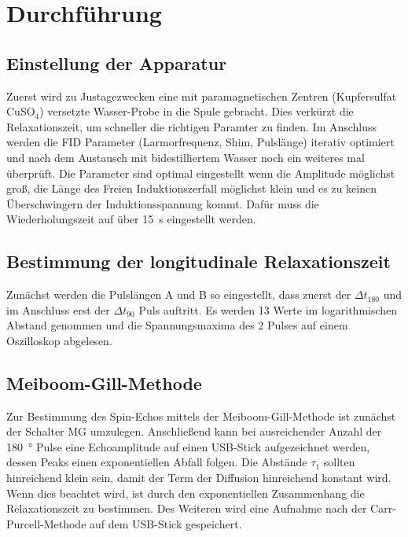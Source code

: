 \section{Durchführung}%
\label{sec:durchfuehrung}

\subsection{Einstellung der Apparatur}%
\label{sub:einstellung_der_apparatur}

Zuerst wird zu Justagezwecken eine mit paramagnetischen Zentren (Kupfersulfat
CuSO$_4$) versetzte Wasser-Probe in die Spule gebracht.
Dies verkürzt die Relaxationszeit, um schneller die richtigen Paramter zu finden.
Im Anschluss werden die FID Parameter (Larmorfrequenz, Shim, Pulslänge) iterativ optimiert und nach dem Austausch
mit bidestilliertem Wasser noch ein weiteres mal überprüft.
Die Parameter sind optimal eingestellt wenn die Amplitude möglichst groß, die
Länge des Freien Induktionszerfall möglichst klein und es zu keinen
Überschwingern der Induktionsspannung kommt.
Dafür muss die Wiederholungszeit auf über \SI{15}{\second} eingestellt werden.

\subsection{Bestimmung der longitudinale Relaxationszeit}%
\label{sub:bestimmung_der_longitudinale_relaxationszeit}
Zunächst werden die Pulslängen A und B so eingestellt, dass zuerst der
$\Delta t_{180}$ und im Anschluss erst der $\Delta t_{90}$ Puls auftritt.
Es werden 13 Werte im logarithmischen Abstand genommen und die
Spannungsmaxima des 2 Pulses auf einem Oszilloskop abgelesen.

\subsection{Meiboom-Gill-Methode}%
\label{sub:meiboom_gill_methode}
Zur Bestimmung des Spin-Echos mittels der Meiboom-Gill-Methode ist zunächst der
Schalter MG umzulegen. Anschließend kann bei ausreichender Anzahl der \SI{180}{\degree}
Pulse eine Echoamplitude auf einen USB-Stick aufgezeichnet werden, dessen Peaks einen
exponentiellen Abfall folgen.
Die Abstände $\tau_1$ sollten hinreichend klein sein, damit der Term der
Diffusion hinreichend konstant wird.
Wenn dies beachtet wird, ist durch den exponentiellen Zusammenhang die
Relaxationszeit zu bestimmen.
Des Weiteren wird eine Aufnahme nach der Carr-Purcell-Methode auf
dem USB-Stick gespeichert.

